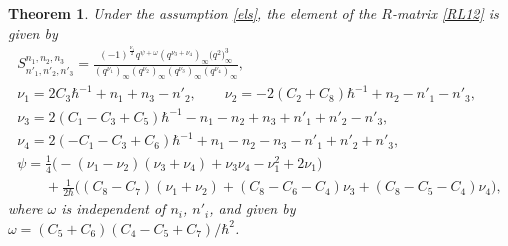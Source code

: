 \documentclass[pdftex]{sigma}
\numberwithin{equation}{section}
\newtheorem{Theorem}{Theorem}[section]
\begin{document}
\begin{Theorem}\label{th:ew}
Under the assumption \eqref{els}, the element
 of the $R$-matrix \eqref{RL12} is given by
\begin{gather}
S^{n_1,n_2, n_3}_{n'_1, n'_2, n'_3} =
\frac{(-1)^{\frac{\nu_1}{2}}q^{\psi+\omega}(q^{\nu_3+\nu_4})_\infty\bigl(q^2\bigr)^3_\infty}
{(q^{\nu_1})_\infty (q^{\nu_2})_\infty (q^{\nu_3})_\infty (q^{\nu_4})_\infty},
\label{Sf}\\
\nu_1 = 2C_3\hbar^{-1}+n_1+n_3-n'_2,
\qquad
\nu_2 = -2(C_2+C_8)\hbar^{-1}+ n_2-n'_1-n'_3,
\\
\nu_3 = 2(C_1-C_3+C_5)\hbar^{-1}-n_1-n_2+n_3+n'_1+n'_2-n'_3,
\\
\nu_4 = 2(-C_1-C_3+C_6)\hbar^{-1}+ n_1-n_2-n_3-n'_1+n'_2+n'_3,
\\
\psi= \tfrac{1}{4}\bigl(-(\nu_1-\nu_2)(\nu_3+\nu_4)+\nu_3\nu_4-\nu_1^2+2\nu_1\bigr)
\nonumber\\
\phantom{\psi= }{} + \tfrac{1}{2\hbar}
\bigl((C_8-C_7)(\nu_1+\nu_2)+(C_8-C_6-C_4)\nu_3 + (C_8-C_5-C_4)\nu_4\bigr),
\label{Spf}
\end{gather}
where $\omega$ is independent of $n_i$, $n'_i$, and given by
$\omega= (C_5+C_6)(C_4-C_5+C_7)/\hbar^2$.
\end{Theorem}
\end{document}
